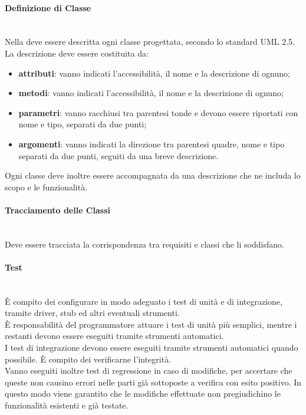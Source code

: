 \paragraph{Definizione di Classe}\mbox{}\\
Nella \DefinizioneDiProdotto\space deve essere descritta ogni classe progettata, secondo lo standard UML 2.5. La descrizione deve essere costituita da:
\begin{itemize}
	\item \textbf{attributi}: vanno indicati l'accessibilità, il nome e la descrizione di ognuno;
	\item \textbf{metodi}: vanno indicati l'accessibilità, il nome e la descrizione di ognuno;
	\item \textbf{parametri}: vanno racchiusi tra parentesi tonde e devono essere riportati con nome e tipo, separati da due punti;
	\item \textbf{argomenti}: vanno indicati la direzione tra parentesi quadre, nome e tipo separati da due punti, seguiti da una breve descrizione.
\end{itemize}
Ogni classe deve inoltre essere accompagnata da una descrizione che ne includa lo scopo e le funzionalità.

\paragraph{Tracciamento delle Classi}\mbox{}\\
Deve essere tracciata la corrispondenza tra requisiti e classi che li soddisfano.

\paragraph{Test}\mbox{}\\
È compito dei \Progettisti\space configurare in modo adeguato i test di unità e di integrazione, tramite driver, stub ed altri eventuali strumenti.\\
È responsabilità del programmatore attuare i test di unità più semplici, mentre i restanti devono essere eseguiti tramite strumenti automatici.\\
I test di integrazione devono essere eseguiti tramite strumenti automatici quando possibile. È compito dei \Verificatori\space verificarne l'integrità.\\
Vanno eseguiti inoltre test di regressione in caso di modifiche, per accertare che queste non causino errori nelle parti già sottoposte a verifica con esito positivo. In questo modo viene garantito che le modifiche effettuate non pregiudichino le funzionalità esistenti e già testate.

